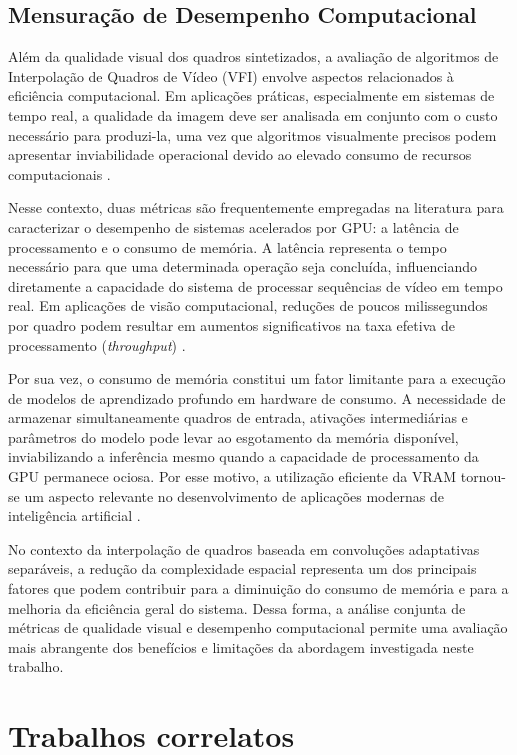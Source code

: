 \documentclass[
    12pt,                %
    openright,           %
    oneside,             %
    a4paper,             %
    english,             %
    brazil               %
]{abntex2}
\begin{document}
\subsection{Mensuração de Desempenho Computacional}

Além da qualidade visual dos quadros sintetizados, a avaliação de algoritmos de Interpolação de Quadros de Vídeo (VFI) envolve aspectos relacionados à eficiência computacional. Em aplicações práticas, especialmente em sistemas de tempo real, a qualidade da imagem deve ser analisada em conjunto com o custo necessário para produzi-la, uma vez que algoritmos visualmente precisos podem apresentar inviabilidade operacional devido ao elevado consumo de recursos computacionais \cite{Kirk2023}.

Nesse contexto, duas métricas são frequentemente empregadas na literatura para caracterizar o desempenho de sistemas acelerados por GPU: a latência de processamento e o consumo de memória. A latência representa o tempo necessário para que uma determinada operação seja concluída, influenciando diretamente a capacidade do sistema de processar sequências de vídeo em tempo real. Em aplicações de visão computacional, reduções de poucos milissegundos por quadro podem resultar em aumentos significativos na taxa efetiva de processamento (\textit{throughput}) \cite{Hennessy2022}.

Por sua vez, o consumo de memória constitui um fator limitante para a execução de modelos de aprendizado profundo em hardware de consumo. A necessidade de armazenar simultaneamente quadros de entrada, ativações intermediárias e parâmetros do modelo pode levar ao esgotamento da memória disponível, inviabilizando a inferência mesmo quando a capacidade de processamento da GPU permanece ociosa. Por esse motivo, a utilização eficiente da VRAM tornou-se um aspecto relevante no desenvolvimento de aplicações modernas de inteligência artificial \cite{NvidiaCUDA2025}.

No contexto da interpolação de quadros baseada em convoluções adaptativas separáveis, a redução da complexidade espacial representa um dos principais fatores que podem contribuir para a diminuição do consumo de memória e para a melhoria da eficiência geral do sistema. Dessa forma, a análise conjunta de métricas de qualidade visual e desempenho computacional permite uma avaliação mais abrangente dos benefícios e limitações da abordagem investigada neste trabalho.
\section{Trabalhos correlatos}
\label{sec:trabalhos_relacionados}
\end{document}

